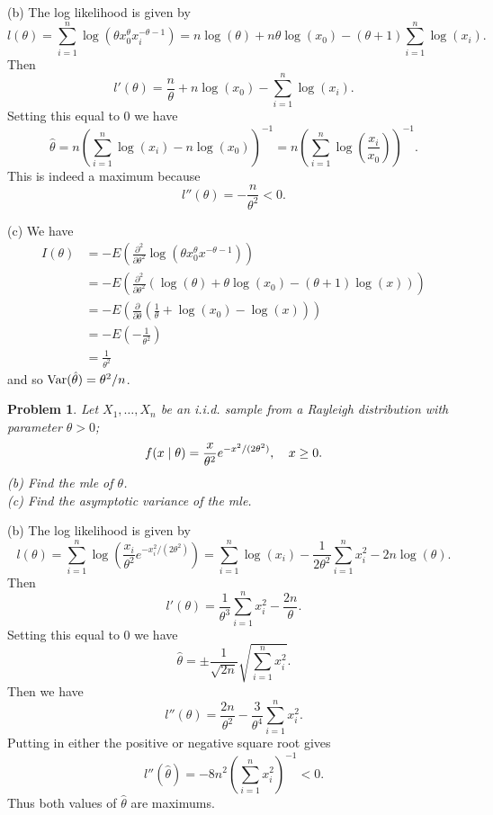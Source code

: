 \documentclass{article}
\newtheorem{problem}{Problem}
\newcommand{\var}{\textup{Var}}
\begin{document}
(b) The log likelihood is given by
\[
l(\theta) = \sum_{i=1}^n \log \left (\theta x_0^{\theta} x_i^{-\theta - 1} \right ) = n\log(\theta) + n\theta \log (x_0) - (\theta + 1) \sum_{i=1}^n \log(x_i).
\]
Then
\[
l'(\theta) = \frac{n}{\theta} + n\log(x_0) - \sum_{i=1}^n \log(x_i).
\]
Setting this equal to $0$ we have
\[
\hat{\theta} = n \left (\sum_{i=1}^n \log(x_i) - n \log(x_0) \right )^{-1} = n \left ( \sum_{i=1}^n \log \left ( \frac{x_i}{x_0} \right ) \right )^{-1}.
\]
This is indeed a maximum because
\[
l''(\theta) = -\frac{n}{\theta^2} < 0.
\]

(c) We have
\begin{align*}
I(\theta)
&= -E \left ( \frac{\partial^2}{\partial \theta^2} \log \left ( \theta x_0^{\theta} x^{-\theta - 1} \right ) \right )\\
&= -E \left ( \frac{\partial^2}{\partial \theta^2} (\log(\theta) + \theta \log(x_0) - (\theta + 1) \log(x) ) \right )\\
&= -E \left ( \frac{\partial}{\partial \theta} \left ( \frac{1}{\theta} + \log(x_0) - \log(x) \right ) \right )\\
&= -E \left ( - \frac{1}{\theta^2} \right )\\
&= \frac{1}{\theta^2}
\end{align*}
and so $\var(\hat{\theta}) = \theta^2/n$.

\begin{problem}
Let $X_1, \dots , X_n$ be an i.i.d. sample from a Rayleigh distribution with parameter $\theta > 0$;
\[
\begin{tabular}{cc}
$\displaystyle{f(x \mid \theta) = \frac{x}{\theta^2}e^{-x^2/(2 \theta^2)}}$, & $\displaystyle{x \geq 0}$.
\end{tabular}
\]
(b) Find the mle of $\theta$.\\
(c) Find the asymptotic variance of the mle.
\end{problem}

(b) The log likelihood is given by
\[
l(\theta) = \sum_{i=1}^n \log \left (\frac{x_i}{\theta^2} e^{-x_i^2/(2 \theta^2)} \right ) = \sum_{i=1}^n \log(x_i) - \frac{1}{2\theta^2} \sum_{i=1}^n x_i^2 - 2n \log(\theta).
\]
Then
\[
l'(\theta) = \frac{1}{\theta^3} \sum_{i=1}^n x_i^2 - \frac{2n}{\theta}.
\]
Setting this equal to $0$ we have
\[
\hat{\theta} = \pm \frac{1}{\sqrt{2n}} \sqrt{ \sum_{i=1}^n x_i^2}.
\]
Then we have
\[
l''(\theta) = \frac{2n}{\theta^2} - \frac{3}{\theta^4} \sum_{i=1}^n x_i^2.
\]
Putting in either the positive or negative square root gives
\[
l''(\hat{\theta}) = -8n^2 \left ( \sum_{i=1}^n x_i^2 \right )^{-1} < 0.
\]
Thus both values of $\hat{\theta}$ are maximums.
\end{document}
